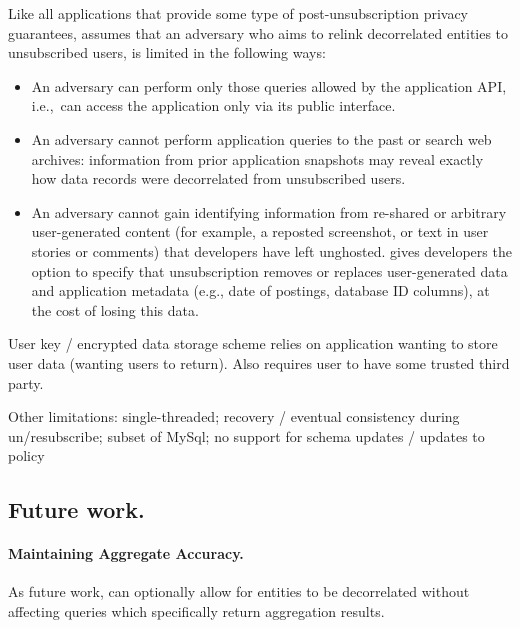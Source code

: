 Like all applications that provide some type of post-unsubscription privacy guarantees, \name assumes
that an adversary who aims to relink decorrelated entities to unsubscribed users, is limited in the
following ways:
\begin{itemize}
    \item An adversary can perform only those queries allowed by the application API,
i.e.,\ can access the application only via its public interface.

    \item An adversary cannot perform application queries to the past or search web archives:
    information from prior application snapshots may reveal
    exactly how data records were decorrelated from unsubscribed users.

    \item An adversary cannot gain identifying information from re-shared or arbitrary
        user-generated content (for example, a reposted screenshot, or text in user stories or
        comments) that developers have left unghosted.
        \name gives developers the option to specify that unsubscription removes or replaces
        user-generated data and application metadata (e.g., date of postings, database ID columns),
        at the cost of losing this data.
\end{itemize}

User key / encrypted data storage scheme relies on application wanting to store user data (wanting
users to return). Also requires user to have some trusted third party.

Other limitations:
single-threaded;
recovery / eventual consistency during un/resubscribe;
subset of MySql;
no support for schema updates / updates to policy

\subsection{Future work.}
\paragraph{Maintaining Aggregate Accuracy.}
As future work, \sys can optionally allow for entities to be decorrelated without affecting queries which
specifically return aggregation results.

